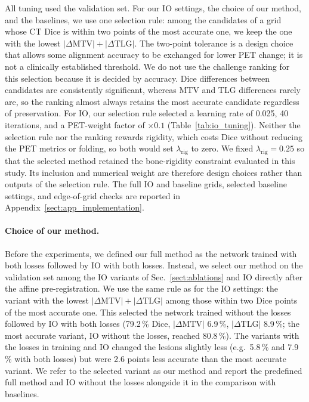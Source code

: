 All tuning used the validation set.
For our IO settings, the choice of our method, and the baselines, we use one selection rule: among the candidates of a grid whose CT Dice is within two points of the most accurate one, we keep the one with the lowest $|\Delta\mathrm{MTV}|+|\Delta\mathrm{TLG}|$.
The two-point tolerance is a design choice that allows some alignment accuracy to be exchanged for lower PET change; it is not a clinically established threshold.
We do not use the challenge ranking for this selection because it is decided by accuracy.
Dice differences between candidates are consistently significant, whereas MTV and TLG differences rarely are, so the ranking almost always retains the most accurate candidate regardless of preservation.
For IO, our selection rule selected a learning rate of 0.025, 40 iterations, and a PET-weight factor of $\times0.1$ (Table~\ref{tab:io_tuning}).
Neither the selection rule nor the ranking rewards rigidity, which costs Dice without reducing the PET metrics or folding, so both would set $\lambda_{\mathrm{rig}}$ to zero.
We fixed $\lambda_{\mathrm{rig}}=0.25$ so that the selected method retained the bone-rigidity constraint evaluated in this study.
Its inclusion and numerical weight are therefore design choices rather than outputs of the selection rule.
The full IO and baseline grids, selected baseline settings, and edge-of-grid checks are reported in Appendix~\ref{sect:app_implementation}.

\paragraph{Choice of our method.}
Before the experiments, we defined our full method as the network trained with both losses followed by IO with both losses.
Instead, we select our method on the validation set among the IO variants of Sec.~\ref{sect:ablations} and IO directly after the affine pre-registration.
We use the same rule as for the IO settings: the variant with the lowest $|\Delta\mathrm{MTV}|+|\Delta\mathrm{TLG}|$ among those within two Dice points of the most accurate one.
This selected the network trained without the losses followed by IO with both losses (79.2\,\% Dice, $|\Delta\mathrm{MTV}|$ 6.9\,\%, $|\Delta\mathrm{TLG}|$ 8.9\,\%; the most accurate variant, IO without the losses, reached 80.8\,\%).
The variants with the losses in training and IO changed the lesions slightly less (e.g.\ 5.8\,\% and 7.9\,\% with both losses) but were 2.6 points less accurate than the most accurate variant.
We refer to the selected variant as our method and report the predefined full method and IO without the losses alongside it in the comparison with baselines.

